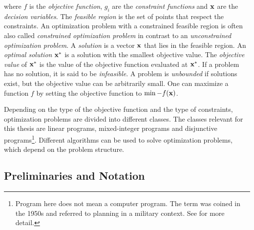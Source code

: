 \quad where $f$ is the \textit{objective function}, $g_i$ are the \textit{constraint functions} and $\bold x$ are the \textit{decision variables}. %
The \textit{feasible region} is the set of points that respect the constraints. An optimization problem with a constrained feasible region is often also called \textit{constrained optimization problem} in contrast to an \textit{unconstrained optimization problem}. A \textit{solution} is a vector $\bold x$ that lies in the feasible region. An \textit{optimal solution} $\bold x^*$ is a solution with the smallest objective value. The \textit{objective value} of $\bold x^*$ is the value of the objective function evaluated at $\bold x^*$. If a problem has no solution, it is said to be \textit{infeasible}. A problem is \textit{unbounded} if solutions exist, but the objective value can be arbitrarily small.
One can maximize a function $f$ by setting the objective function to $\min -f(\bold x)$.

Depending on the type of the objective function and the type of constraints, optimization problems are divided into different classes. The classes relevant for this thesis are linear programs, mixed-integer programs and disjunctive programs\footnote[1]{Program here does not mean a computer program. The term was coined in the 1950s and referred to planning in a military context. See \cite{understanding_lp} for more detail.}. 
Different algorithms can be used to solve optimization problems, which depend on the problem structure.

\subsection{Preliminaries and Notation}

